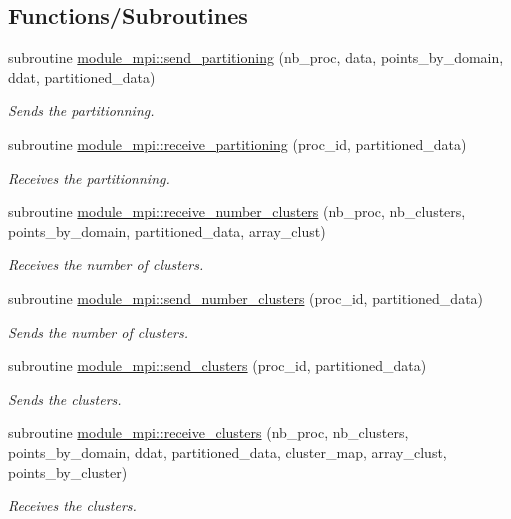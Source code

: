 \subsection*{Functions/\+Subroutines}
\begin{DoxyCompactItemize}
\item 
subroutine \hyperlink{namespacemodule__mpi_a8f29a8b24f027344c03e639dc747e849}{module\+\_\+mpi\+::send\+\_\+partitioning} (nb\+\_\+proc, data, points\+\_\+by\+\_\+domain, ddat, partitioned\+\_\+data)
\begin{DoxyCompactList}\small\item\em Sends the partitionning. \end{DoxyCompactList}\item 
subroutine \hyperlink{namespacemodule__mpi_a2066496a812a1babe9ad15d90d01feea}{module\+\_\+mpi\+::receive\+\_\+partitioning} (proc\+\_\+id, partitioned\+\_\+data)
\begin{DoxyCompactList}\small\item\em Receives the partitionning. \end{DoxyCompactList}\item 
subroutine \hyperlink{namespacemodule__mpi_a62be40b2a3129f7c49677cc68eba40e8}{module\+\_\+mpi\+::receive\+\_\+number\+\_\+clusters} (nb\+\_\+proc, nb\+\_\+clusters, points\+\_\+by\+\_\+domain, partitioned\+\_\+data, array\+\_\+clust)
\begin{DoxyCompactList}\small\item\em Receives the number of clusters. \end{DoxyCompactList}\item 
subroutine \hyperlink{namespacemodule__mpi_a5254902c6427631ec28067e9c88481f3}{module\+\_\+mpi\+::send\+\_\+number\+\_\+clusters} (proc\+\_\+id, partitioned\+\_\+data)
\begin{DoxyCompactList}\small\item\em Sends the number of clusters. \end{DoxyCompactList}\item 
subroutine \hyperlink{namespacemodule__mpi_a0e866540092c31b9cd5fb527cda5714e}{module\+\_\+mpi\+::send\+\_\+clusters} (proc\+\_\+id, partitioned\+\_\+data)
\begin{DoxyCompactList}\small\item\em Sends the clusters. \end{DoxyCompactList}\item 
subroutine \hyperlink{namespacemodule__mpi_ac81a5a711ffecf500db9dd0d05bedd29}{module\+\_\+mpi\+::receive\+\_\+clusters} (nb\+\_\+proc, nb\+\_\+clusters, points\+\_\+by\+\_\+domain, ddat, partitioned\+\_\+data, cluster\+\_\+map, array\+\_\+clust, points\+\_\+by\+\_\+cluster)
\begin{DoxyCompactList}\small\item\em Receives the clusters. \end{DoxyCompactList}\end{DoxyCompactItemize}

